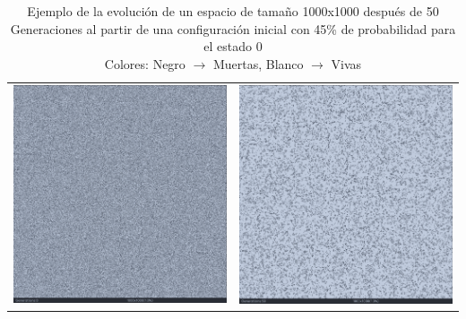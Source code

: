 \documentclass[]{article}
\begin{document}
\begin{landscape}
			\newpage
			\hfill \break
			\hfill \break
			\hfill \break
			\hfill \break
			\hfill \break
			\hfill \break
			\hfill \break
			\begin{table}[!h]
			\centering
			\begin{tabular}{c c}
				\includegraphics[width=11cm]{Imagenes/Evolucion_1000x1000_0Gen.png} &
				\includegraphics[width=11cm]{Imagenes/Evolucion_1000x1000_50Gen.png}
			\end{tabular}
			\caption{Ejemplo de la evolución de un espacio de tamaño 1000x1000 después de 50 Generaciones al partir de una configuración inicial con 45\% de probabilidad para el estado 0 \\ Colores: Negro $\rightarrow$ Muertas, Blanco $\rightarrow$ Vivas}
			\label{Evolucion_1000x1000}
			\end{table}
		\end{landscape}
	
\end{document}
